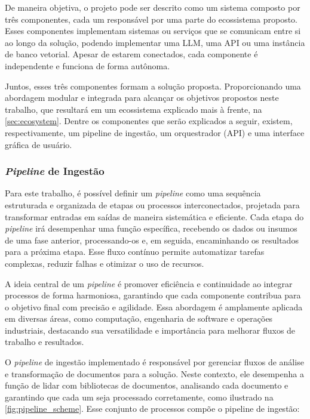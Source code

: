 \documentclass[a4paper, 12pt]{article}
\begin{document}
    De maneira objetiva, o projeto pode ser descrito como um sistema composto por três componentes, cada um responsável por uma parte do ecossistema proposto. Esses componentes implementam sistemas ou serviços que se comunicam entre si ao longo da solução, podendo implementar uma LLM, uma API ou uma instância de banco vetorial. Apesar de estarem conectados, cada componente é independente e funciona de forma autônoma.
    
    Juntos, esses três componentes formam a solução proposta. Proporcionando uma abordagem modular e integrada para alcançar os objetivos propostos neste trabalho, que resultará em um ecossistema explicado mais à frente, na \autoref{sec:ecosystem}. Dentre os componentes que serão explicados a seguir, existem, respectivamente, um pipeline de ingestão, um orquestrador (API) e uma interface gráfica de usuário.
    
    \subsubsection{\textit{Pipeline} de Ingestão} \label{sec:pipeline}

    Para este trabalho, é possível definir um \textit{pipeline} como uma sequência estruturada e organizada de etapas ou processos interconectados, projetada para transformar entradas em saídas de maneira sistemática e eficiente. Cada etapa do \textit{pipeline} irá desempenhar uma função específica, recebendo os dados ou insumos de uma fase anterior, processando-os e, em seguida, encaminhando os resultados para a próxima etapa. Esse fluxo contínuo permite automatizar tarefas complexas, reduzir falhas e otimizar o uso de recursos. 
    
    A ideia central de um \textit{pipeline} é promover eficiência e continuidade ao integrar processos de forma harmoniosa, garantindo que cada componente contribua para o objetivo final com precisão e agilidade. Essa abordagem é amplamente aplicada em diversas áreas, como computação, engenharia de software e operações industriais, destacando sua versatilidade e importância para melhorar fluxos de trabalho e resultados. 

    O \textit{pipeline} de ingestão implementado é responsável por gerenciar fluxos de análise e transformação de documentos para a solução. Neste contexto, ele desempenha a função de lidar com bibliotecas de documentos, analisando cada documento e garantindo que cada um seja processado corretamente, como ilustrado na \autoref{fig:pipeline_scheme}. Esse conjunto de processos compõe o pipeline de ingestão:
    
\end{document}
